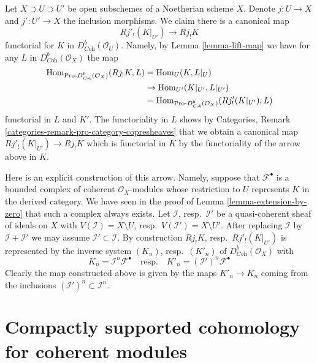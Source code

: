\begin{remark}
\label{remark-covariance-open-j-lower-shriek}
Let $X \supset U \supset U'$ be open subschemes of a Noetherian scheme $X$.
Denote $j : U \to X$ and $j' : U' \to X$ the inclusion morphisms.
We claim there is a canonical map
$$
Rj'_!(K|_{U'}) \longrightarrow Rj_!K
$$
functorial for $K$ in $D^b_{\textit{Coh}}(\mathcal{O}_U)$. Namely, by
Lemma \ref{lemma-lift-map} we have for any $L$ in
$D^b_{\textit{Coh}}(\mathcal{O}_X)$ the map
\begin{align*}
\mathop{\mathrm{Hom}}\nolimits_{\text{Pro-}D^b_{\textit{Coh}}(\mathcal{O}_X)}(Rj_!K, L)
& =
\mathop{\mathrm{Hom}}\nolimits_U(K, L|_U) \\
& \to
\mathop{\mathrm{Hom}}\nolimits_{U'}(K|_{U'}, L|_{U'}) \\
& =
\mathop{\mathrm{Hom}}\nolimits_{\text{Pro-}D^b_{\textit{Coh}}(\mathcal{O}_X)}(Rj'_!(K|_{U'}), L)
\end{align*}
functorial in $L$ and $K'$. The functoriality in $L$ shows by
Categories, Remark \ref{categories-remark-pro-category-copresheaves}
that we obtain a canonical map $Rj'_!(K|_{U'}) \to Rj_!K$ which is
functorial in $K$ by the functoriality of the arrow above in $K$.

\medskip\noindent
Here is an explicit construction of this arrow. Namely, suppose
that $\mathcal{F}^\bullet$ is a bounded complex of coherent
$\mathcal{O}_X$-modules whose restriction to $U$ represents $K$
in the derived category. We have seen in the proof of
Lemma \ref{lemma-extension-by-zero}
that such a complex always exists. Let $\mathcal{I}$, resp.\ $\mathcal{I}'$
be a quasi-coherent sheaf of ideals on $X$ with
$V(\mathcal{I}) = X \setminus U$, resp.\ $V(\mathcal{I}') = X \setminus U'$.
After replacing $\mathcal{I}$ by $\mathcal{I} + \mathcal{I}'$
we may assume $\mathcal{I}' \subset \mathcal{I}$.
By construction $Rj_!K$, resp.\ $Rj'_!(K|_{U'})$ is represented by the
inverse system $(K_n)$, resp.\ $(K'_n)$ of $D^b_{\textit{Coh}}(\mathcal{O}_X)$
with
$$
K_n = \mathcal{I}^n\mathcal{F}^\bullet
\quad\text{resp.}\quad
K'_n = (\mathcal{I}')^n\mathcal{F}^\bullet
$$
Clearly the map constructed above is given by the maps
$K'_n \to K_n$ coming from the inclusions
$(\mathcal{I}')^n \subset \mathcal{I}^n$.
\end{remark}






\section{Compactly supported cohomology for coherent modules}
\label{section-compactly-supported}

